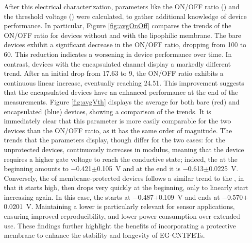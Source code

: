 After this electrical characterization, parameters like the ON/OFF ratio (\ratio{}) and the threshold voltage (\vth{}) were calculated, to gather additional knowledge of device performance. In particular, Figure \ref{fig:avgOnOff} compares the trends of the ON/OFF ratio for devices without and with the lipophilic membrane. The bare devices exhibit a significant decrease in the ON/OFF ratio, dropping from 100 to 60. This reduction indicates a worsening in device performance over time. In contrast, devices with the encapsulated channel display a markedly different trend. After an initial drop from 17.63 to 9, the ON/OFF ratio exhibits a continuous linear increase, eventually reaching 24.51. This improvement suggests that the encapsulated devices have an enhanced performance at the end of the measurements.
Figure \ref{fig:avgVth} displays the average \vth{} for both bare (red) and encapsulated (blue) devices, showing a comparison of the trends. It is immediately clear that this parameter is more easily comparable for the two devices than the ON/OFF ratio, as it has the same order of magnitude. The trends that the parameters display, though differ for the two cases: for the unprotected devices, \vth{} continuously increases in modulus, meaning that the device requires a higher gate voltage to reach the conductive state; indeed, the \vth{} at the beginning amounts to \SI{-0.421}{}$\pm$\SI{0.105}{\V} and at the end it is \SI{-0.613}{}$\pm$\SI{0.0225}{\V}. Conversely, the \vth{} of membrane-protected devices
follows a similar trend to the \ion{}, in that it starts high, then drops very quickly at the beginning, only to linearly start increasing again. In this case, the \vth{} starts at \SI{-0.487}{}$\pm$\SI{0.109}{\V} and ends at \SI{-0.570}{}$\pm$\SI{0.0201}{\V}. Maintaining a lower \vth{} is particularly relevant for sensor applications, ensuring improved reproducibility, and lower power consumption over extended use. These findings further highlight the benefits of incorporating a protective membrane to enhance the stability and longevity of EG-CNTFETs.
